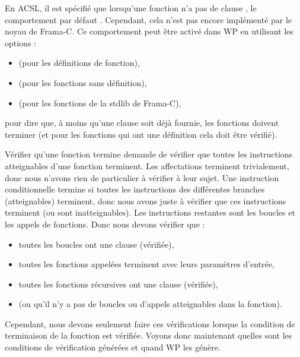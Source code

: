 \begin{Information}
  En ACSL, il est spécifié que lorsqu'une fonction n'a pas de clause
  , le comportement par défaut
  . Cependant, cela n'est pas
  encore implémenté par le noyau de Frama-C. Ce comportement peut être activé
  dans WP en utilisant les options :
  \begin{itemize}
  \item {} (pour les définitions de fonction),
  \item {} (pour les fonctions sans définition),
  \item {} (pour les fonctions de la stdlib de Frama\nobreakdash-C),
  \end{itemize}
  pour dire que, à moins qu'une clause soit déjà fournie, les fonctions doivent
  terminer (et pour les fonctions qui ont une définition cela doit être vérifié).
\end{Information}




Vérifier qu'une fonction termine demande de vérifier que toutes les instructions
atteignables d'une fonction terminent. Les affectations terminent trivialement,
donc nous n'avons rien de particulier à vérifier à leur sujet. Une instruction
conditionnelle termine si toutes les instructions des différentes branches
(atteignables) terminent, donc nous avons juste à vérifier que ces instructions
terminent (ou sont inatteignables). Les instructions restantes sont les boucles
et les appels de fonctions. Donc nous devons vérifier que :
\begin{itemize}
  \item toutes les boucles ont une clause  (vérifiée),
  \item toutes les fonctions appelées terminent avec leurs paramètres d'entrée,
  \item toutes les fonctions récursives ont une clause  (vérifiée),
  \item (ou qu'il n'y a pas de boucles ou d'appels atteignables dans la fonction).
\end{itemize}


Cependant, nous devons seulement faire ces vérifications lorsque la condition de
terminaison de la fonction est vérifiée. Voyons donc maintenant quelles sont les
conditions de vérification générées et quand WP les génère.



